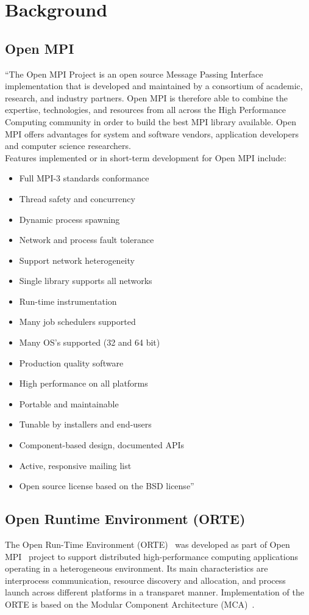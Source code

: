 \chapter{Background}
\label{sec:Background}

\section{Open MPI}
\label{sec:openmpi}
``The Open MPI Project is an open source Message Passing Interface implementation that is developed and maintained by a consortium of academic, research, and industry partners. Open MPI is therefore able to combine the expertise, technologies, and resources from all across the High Performance Computing community in order to build the best MPI library available. Open MPI offers advantages for system and software vendors, application developers and computer science researchers.\\
Features implemented or in short-term development for Open MPI include:
\begin{itemize}
  \item Full MPI-3 standards conformance
  \item Thread safety and concurrency
  \item Dynamic process spawning
  \item Network and process fault tolerance
  \item Support network heterogeneity
  \item Single library supports all networks
  \item Run-time instrumentation
  \item Many job schedulers supported
  \item Many OS's supported (32 and 64 bit)
  \item Production quality software
  \item High performance on all platforms
  \item Portable and maintainable
  \item Tunable by installers and end-users
  \item Component-based design, documented APIs
  \item Active, responsive mailing list
  \item Open source license based on the BSD license''~\cite{openmpi}
\end{itemize}
    
\section{Open Runtime Environment (ORTE)}
\label{sec:orte}
The Open Run-Time Environment (ORTE)~\cite{Castain2008153} was developed as part of Open MPI~\cite{gabriel04:_open_mpi} project to support distributed high-performance computing applications operating in a heterogeneous environment. Its main characteristics are interprocess communication, resource discovery and allocation, and process launch across different platforms in a transparet manner. Implementation of the ORTE is based on the Modular Component Architecture (MCA)~\cite{gabriel04:_open_mpi}.

